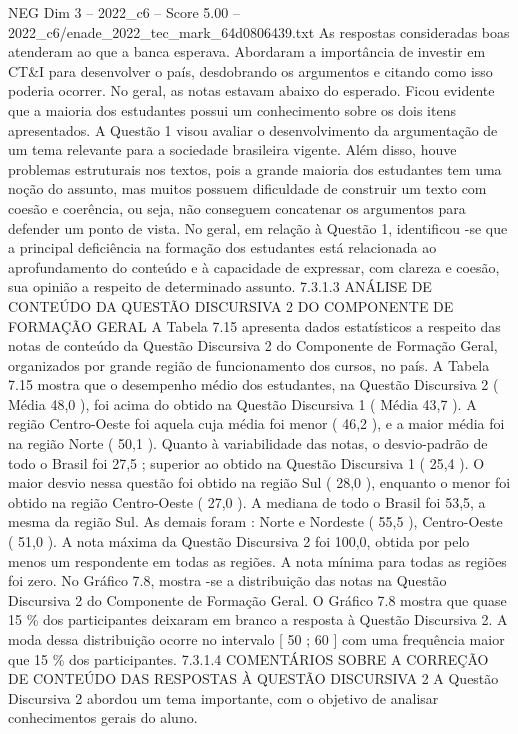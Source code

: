 \begin{textsample}{NEG Dim 3 – 2022\_c6 – Score 5.00 – 2022\_c6/enade\_2022\_tec\_mark\_64d0806439.txt}
As respostas consideradas boas atenderam ao que a banca esperava.
Abordaram a importância de investir em CT\&I para desenvolver o país, desdobrando os argumentos e citando como isso poderia ocorrer.
No geral, as notas estavam abaixo do esperado.
Ficou evidente que a maioria dos estudantes possui um conhecimento sobre os dois itens apresentados.
A Questão 1 visou avaliar o desenvolvimento da argumentação de um tema relevante para a sociedade brasileira vigente.
Além disso, houve problemas estruturais nos textos, pois a grande maioria dos estudantes tem uma noção do assunto, mas muitos possuem dificuldade de construir um texto com coesão e coerência, ou seja, não conseguem concatenar os argumentos para defender um ponto de vista.
No geral, em relação à Questão 1, identificou -se que a principal deficiência na formação dos estudantes está relacionada ao aprofundamento do conteúdo e à capacidade de expressar, com clareza e coesão, sua opinião a respeito de determinado assunto. 7.3.1.3 ANÁLISE DE CONTEÚDO DA QUESTÃO DISCURSIVA 2 DO COMPONENTE DE FORMAÇÃO GERAL A Tabela 7.15 apresenta dados estatísticos a respeito das notas de conteúdo da Questão Discursiva 2 do Componente de Formação Geral, organizados por grande região de funcionamento dos cursos, no país.
A Tabela 7.15 mostra que o desempenho médio dos estudantes, na Questão Discursiva 2 ( Média 48,0 ), foi acima do obtido na Questão Discursiva 1 ( Média 43,7 ).
A região Centro-Oeste foi aquela cuja média foi menor ( 46,2 ), e a maior média foi na região Norte ( 50,1 ).
Quanto à variabilidade das notas, o desvio-padrão de todo o Brasil foi 27,5 ; superior ao obtido na Questão Discursiva 1 ( 25,4 ).
O maior desvio nessa questão foi obtido na região Sul ( 28,0 ), enquanto o menor foi obtido na região Centro-Oeste ( 27,0 ).
A mediana de todo o Brasil foi 53,5, a mesma da região Sul.
As demais foram : Norte e Nordeste ( 55,5 ), Centro-Oeste ( 51,0 ).
A nota máxima da Questão Discursiva 2 foi 100,0, obtida por pelo menos um respondente em todas as regiões.
A nota mínima para todas as regiões foi zero.
No Gráfico 7.8, mostra -se a distribuição das notas na Questão Discursiva 2 do Componente de Formação Geral.
O Gráfico 7.8 mostra que quase 15 \% dos participantes deixaram em branco a resposta à Questão Discursiva 2.
A moda dessa distribuição ocorre no intervalo [ 50 ; 60 ] com uma frequência maior que 15 \% dos participantes. 7.3.1.4 COMENTÁRIOS SOBRE A CORREÇÃO DE CONTEÚDO DAS RESPOSTAS À QUESTÃO DISCURSIVA 2 A Questão Discursiva 2 abordou um tema importante, com o objetivo de analisar conhecimentos gerais do aluno.

\end{textsample}
